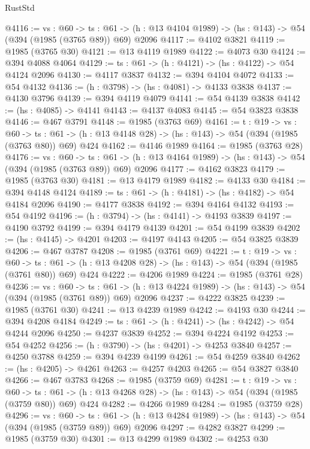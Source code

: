 \begin{lexlean}{RustStd}
\begin{coremodule}
{\begin{coremodule}
{{{{{{{{@4116 := {vs : @60} ->
  {ts : @61} -> (h : @13 @4104 @1989) -> (hs : @143) -> @54 (@394 (@1985 (@3765 @89)) @69) @2096
@4117 := @4102 @3821
@4119 := @1985 (@3765 @30)
@4121 := @13 @4119 @1989
@4122 := @4073 @30
@4124 := @394 @4088 @4064
@4129 := {ts : @61} -> (h : @4121) -> (hs : @4122) -> @54 @4124 @2096
@4130 := @4117 @3837
@4132 := @394 @4104 @4072
@4133 := @54 @4132
@4136 := (h : @3798) -> (hs : @4081) -> @4133 @3838
@4137 := @4130 @3796
@4139 := @394 @4119 @4079
@4141 := @54 @4139 @3838
@4142 := (hs : @4085) -> @4141
@4143 := @4137 @4083
@4145 := @54 @3823 @3838
@4146 := @467 @3791
@4148 := @1985 (@3763 @69)
@4161 := {t : @19} ->
  {vs : @60} ->
  {ts : @61} -> (h : @13 @4148 @28) -> (hs : @143) -> @54 (@394 (@1985 (@3763 @80)) @69) @424
@4162 := @4146 @1989
@4164 := @1985 (@3763 @28)
@4176 := {vs : @60} ->
  {ts : @61} -> (h : @13 @4164 @1989) -> (hs : @143) -> @54 (@394 (@1985 (@3763 @89)) @69) @2096
@4177 := @4162 @3823
@4179 := @1985 (@3763 @30)
@4181 := @13 @4179 @1989
@4182 := @4133 @30
@4184 := @394 @4148 @4124
@4189 := {ts : @61} -> (h : @4181) -> (hs : @4182) -> @54 @4184 @2096
@4190 := @4177 @3838
@4192 := @394 @4164 @4132
@4193 := @54 @4192
@4196 := (h : @3794) -> (hs : @4141) -> @4193 @3839
@4197 := @4190 @3792
@4199 := @394 @4179 @4139
@4201 := @54 @4199 @3839
@4202 := (hs : @4145) -> @4201
@4203 := @4197 @4143
@4205 := @54 @3825 @3839
@4206 := @467 @3787
@4208 := @1985 (@3761 @69)
@4221 := {t : @19} ->
  {vs : @60} ->
  {ts : @61} -> (h : @13 @4208 @28) -> (hs : @143) -> @54 (@394 (@1985 (@3761 @80)) @69) @424
@4222 := @4206 @1989
@4224 := @1985 (@3761 @28)
@4236 := {vs : @60} ->
  {ts : @61} -> (h : @13 @4224 @1989) -> (hs : @143) -> @54 (@394 (@1985 (@3761 @89)) @69) @2096
@4237 := @4222 @3825
@4239 := @1985 (@3761 @30)
@4241 := @13 @4239 @1989
@4242 := @4193 @30
@4244 := @394 @4208 @4184
@4249 := {ts : @61} -> (h : @4241) -> (hs : @4242) -> @54 @4244 @2096
@4250 := @4237 @3839
@4252 := @394 @4224 @4192
@4253 := @54 @4252
@4256 := (h : @3790) -> (hs : @4201) -> @4253 @3840
@4257 := @4250 @3788
@4259 := @394 @4239 @4199
@4261 := @54 @4259 @3840
@4262 := (hs : @4205) -> @4261
@4263 := @4257 @4203
@4265 := @54 @3827 @3840
@4266 := @467 @3783
@4268 := @1985 (@3759 @69)
@4281 := {t : @19} ->
  {vs : @60} ->
  {ts : @61} -> (h : @13 @4268 @28) -> (hs : @143) -> @54 (@394 (@1985 (@3759 @80)) @69) @424
@4282 := @4266 @1989
@4284 := @1985 (@3759 @28)
@4296 := {vs : @60} ->
  {ts : @61} -> (h : @13 @4284 @1989) -> (hs : @143) -> @54 (@394 (@1985 (@3759 @89)) @69) @2096
@4297 := @4282 @3827
@4299 := @1985 (@3759 @30)
@4301 := @13 @4299 @1989
@4302 := @4253 @30
}}}}}}}}
\end{coremodule}}
\end{coremodule}
\end{lexlean}
